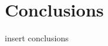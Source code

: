 \documentclass{aa}   %
\begin{document}
\section{Conclusions} \label{sec:conclusions}
insert conclusions
\begin{acknowledgements}
\end{acknowledgements}

\end{document}
